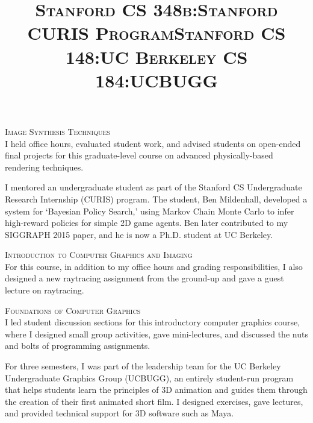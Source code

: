 \documentclass[line,margin]{res}
\begin{document}
\begin{resume}

\title{\textsc{Stanford CS 348b:}}
\begin{position}
\textsc{Image Synthesis Techniques}\\
I held office hours, evaluated student work, and advised students on open-ended final projects for this graduate-level course on advanced physically-based rendering techniques.
\end{position}

\title{\textsc{Stanford CURIS Program}}
\begin{position}
I mentored an undergraduate student as part of the Stanford CS Undergraduate Research Internship (CURIS) program. The student, Ben Mildenhall, developed a system for `Bayesian Policy Search,' using Markov Chain Monte Carlo to infer high-reward policies for simple 2D game agents. Ben later contributed to my SIGGRAPH 2015 paper, and he is now a Ph.D. student at UC Berkeley.
\end{position}

\title{\textsc{Stanford CS 148:}}
\begin{position}
\textsc{Introduction to Computer Graphics and Imaging}\\
For this course, in addition to my office hours and grading responsibilities, I also designed a new raytracing assignment from the ground-up and gave a guest lecture on raytracing.
\end{position}

\title{\textsc{UC Berkeley CS 184:}}
\begin{position}
\textsc{Foundations of Computer Graphics}\\
I led student discussion sections for this introductory computer graphics course, where I designed small group activities, gave mini-lectures, and discussed the nuts and bolts of programming assignments.
\end{position}

\title{\textsc{UCBUGG}}
\begin{position}
For three semesters, I was part of the leadership team for the UC Berkeley Undergraduate Graphics Group (UCBUGG), an entirely student-run program that helps students learn the principles of 3D animation and guides them through the creation of their first animated short film. I designed exercises, gave lectures, and provided technical support for 3D software such as Maya.
\end{position}


\end{resume}
\end{document}
